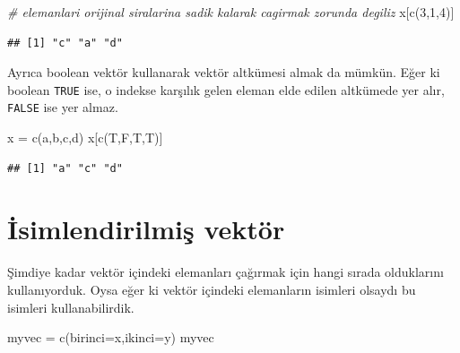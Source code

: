 \documentclass[
]{book}
\newenvironment{Shaded}{\begin{snugshade}}{\end{snugshade}}
\newcommand{\AttributeTok}[1]{\textcolor[rgb]{0.77,0.63,0.00}{#1}}
\newcommand{\CommentTok}[1]{\textcolor[rgb]{0.56,0.35,0.01}{\textit{#1}}}
\newcommand{\DecValTok}[1]{\textcolor[rgb]{0.00,0.00,0.81}{#1}}
\newcommand{\FunctionTok}[1]{\textcolor[rgb]{0.00,0.00,0.00}{#1}}
\newcommand{\NormalTok}[1]{#1}
\newcommand{\OtherTok}[1]{\textcolor[rgb]{0.56,0.35,0.01}{#1}}
\newcommand{\StringTok}[1]{\textcolor[rgb]{0.31,0.60,0.02}{#1}}
\begin{document}
\begin{Shaded}
\begin{Highlighting}[]
\CommentTok{\# elemanlari orijinal siralarina sadik kalarak cagirmak zorunda degiliz}
\NormalTok{x[}\FunctionTok{c}\NormalTok{(}\DecValTok{3}\NormalTok{,}\DecValTok{1}\NormalTok{,}\DecValTok{4}\NormalTok{)]}
\end{Highlighting}
\end{Shaded}

\begin{verbatim}
## [1] "c" "a" "d"
\end{verbatim}

Ayrıca boolean vektör kullanarak vektör altkümesi almak da mümkün. Eğer ki boolean \texttt{TRUE} ise, o indekse karşılık gelen eleman elde edilen altkümede yer alır, \texttt{FALSE} ise yer almaz.

\begin{Shaded}
\begin{Highlighting}[]
\NormalTok{x }\OtherTok{=} \FunctionTok{c}\NormalTok{(}\StringTok{\textquotesingle{}a\textquotesingle{}}\NormalTok{,}\StringTok{\textquotesingle{}b\textquotesingle{}}\NormalTok{,}\StringTok{\textquotesingle{}c\textquotesingle{}}\NormalTok{,}\StringTok{\textquotesingle{}d\textquotesingle{}}\NormalTok{)}
\NormalTok{x[}\FunctionTok{c}\NormalTok{(T,F,T,T)]}
\end{Highlighting}
\end{Shaded}

\begin{verbatim}
## [1] "a" "c" "d"
\end{verbatim}

\hypertarget{isimlendirilmiux15f-vektuxf6r}{%
\section{İsimlendirilmiş vektör}\label{isimlendirilmiux15f-vektuxf6r}}

Şimdiye kadar vektör içindeki elemanları çağırmak için hangi sırada olduklarını kullanıyorduk. Oysa eğer ki vektör içindeki elemanların isimleri olsaydı bu isimleri kullanabilirdik.

\begin{Shaded}
\begin{Highlighting}[]
\NormalTok{myvec }\OtherTok{=} \FunctionTok{c}\NormalTok{(}\AttributeTok{birinci=}\StringTok{\textquotesingle{}x\textquotesingle{}}\NormalTok{,}\AttributeTok{ikinci=}\StringTok{\textquotesingle{}y\textquotesingle{}}\NormalTok{)}
\NormalTok{myvec}
\end{Highlighting}
\end{Shaded}
\end{document}
